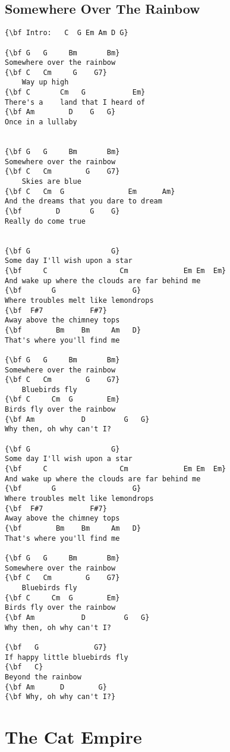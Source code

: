 \documentclass[a4paper]{article}
\begin{document}
\subsection{Somewhere Over The Rainbow}
\begin{Verbatim}[commandchars=\\\{\}]
{\bf Intro:   C  G Em Am D G}

{\bf G   G     Bm       Bm}
Somewhere over the rainbow
{\bf C   Cm     G    G7}
    Way up high
{\bf C       Cm   G           Em}
There's a    land that I heard of
{\bf Am        D    G   G}
Once in a lullaby


{\bf G   G     Bm       Bm}
Somewhere over the rainbow
{\bf C   Cm        G    G7}
    Skies are blue
{\bf C   Cm  G               Em      Am}
And the dreams that you dare to dream
{\bf        D       G    G}
Really do come true


{\bf G                   G}
Some day I'll wish upon a star
{\bf     C                 Cm             Em Em  Em}
And wake up where the clouds are far behind me
{\bf       G                  G}
Where troubles melt like lemondrops
{\bf  F#7           F#7}
Away above the chimney tops
{\bf        Bm    Bm     Am   D}
That's where you'll find me

{\bf G   G     Bm       Bm}
Somewhere over the rainbow
{\bf C   Cm        G    G7}
    Bluebirds fly
{\bf C     Cm  G        Em}
Birds fly over the rainbow
{\bf Am           D         G   G}
Why then, oh why can't I?

{\bf G                   G}
Some day I'll wish upon a star
{\bf     C                 Cm             Em Em  Em}
And wake up where the clouds are far behind me
{\bf       G                  G}
Where troubles melt like lemondrops
{\bf  F#7           F#7}
Away above the chimney tops
{\bf        Bm    Bm     Am   D}
That's where you'll find me

{\bf G   G     Bm       Bm}
Somewhere over the rainbow
{\bf C   Cm        G    G7}
    Bluebirds fly
{\bf C     Cm  G        Em}
Birds fly over the rainbow
{\bf Am           D         G   G}
Why then, oh why can't I?

{\bf   G             G7}
If happy little bluebirds fly
{\bf   C}
Beyond the rainbow
{\bf Am      D        G}
{\bf Why, oh why can't I?}

\end{Verbatim}
\newpage
\section{The Cat Empire}
\end{document}

